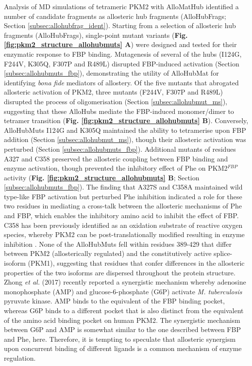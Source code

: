 Analysis of MD simulations of tetrameric PKM2 with AlloMatHub identified a number of candidate fragments as allosteric hub fragments (AlloHubFrags; Section \ref{subsec:allohubfrag_ident}). Starting from a selection of allosteric hub fragments (AlloHubFrags), single-point mutant variants (\textbf{Fig. \ref{fig:pkm2_structure_allohubmuts} A}) were designed and tested for their enzymatic response to FBP binding. Mutagenesis of several of the hubs (I124G, F244V, K305Q, F307P and R489L) disrupted FBP-induced activation (Section \ref{subsec:allohubmuts_fbp}), demonstrating the utility of AlloHubMat for identifying \textit{bona fide} mediators of allostery. Of the five mutants that abrogated allosteric activation of PKM2, three mutants (F244V, F307P and R489L) disrupted the process of oligomerisation (Section \ref{subsec:allohubmut_ms}), suggesting that these AlloHubs mediate the FBP-induced monomer/dimer to tetramer transition (\textbf{Fig. \ref{fig:pkm2_structure_allohubmuts} B}). Conversely, AlloHubMuts I124G and K305Q maintained the ability to tetramerise upon FBP addition (Section \ref{subsec:allohubmut_ms}), though their allosteric activation was perturbed (Section \ref{subsec:allohubmuts_fbp}). Additional mutants of residues A327 and C358 preserved the allosteric coupling between FBP binding and enzyme activation, though prevented the inhibitory effect of Phe on PKM2$^{FBP}$ activity (\textbf{Fig. \ref{fig:pkm2_structure_allohubmuts} B}; Section \ref{subsec:allohubmuts_fbp}). The finding that A327S and C358A maintained wild type-like FBP activation but perturbed Phe inhibition indicated a role for these two residues in mediating a cross-talk between the allosteric mechanisms of Phe and FBP, which enables the inhibitory amino acid to inhibit the effect of FBP. C358 has been previously identified as an oxidation substrate of reactive oxygen species, whereby PKM2 can be post-translationally modified resulting in enzyme inhibition \cite{Anastasiou:2011aa}. None of the AlloHubMuts fell within residues 389-429 that differ between PKM2 (allosterically regulated) and the constitutively active splice-isoform (PKM1), suggesting that residues that confer differences in the allosteric properties of the two isoforms are dispersed throughout the protein structure. Zhong \textit{et al.} (2017) \cite{Zhong:2017aa} recently reported a synergistic mechanism whereby adenosine monophosphate (AMP) and glucose-6-phosphate (G6P) activate \textit{M. tuberculosis} pyruvate kinase. AMP binds to the equivalent of the FBP binding pocket, whereas G6P binds to a different pocket that is also distinct from the equivalent of the amino acid binding pocket on human PKM2. The synergistic mechanism between G6P and AMP is somewhat similar to the one described between FBP and Phe, here. Therefore, it is tempting to speculate that allosteric synergism upon concurrent binding of different ligands is a common mechanism of enzyme regulation.   
